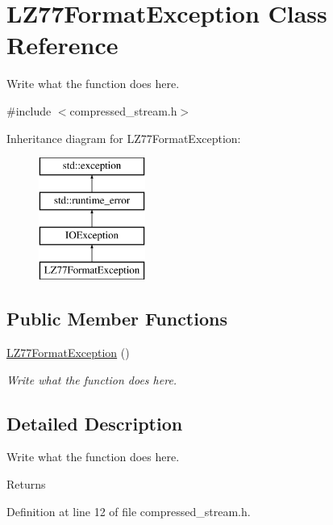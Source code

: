 \hypertarget{classLZ77FormatException}{\section{L\+Z77\+Format\+Exception Class Reference}
\label{classLZ77FormatException}
}


Write what the function does here.  




{\ttfamily \#include $<$compressed\+\_\+stream.\+h$>$}

Inheritance diagram for L\+Z77\+Format\+Exception\+:\begin{figure}[H]
\begin{center}
\leavevmode
\includegraphics[height=4.000000cm]{classLZ77FormatException}
\end{center}
\end{figure}
\subsection*{Public Member Functions}
\begin{DoxyCompactItemize}
\item 
\hyperlink{classLZ77FormatException_ad7d83449811bccd5172e5ba76960d3d3}{L\+Z77\+Format\+Exception} ()
\begin{DoxyCompactList}\small\item\em Write what the function does here. \end{DoxyCompactList}\end{DoxyCompactItemize}


\subsection{Detailed Description}
Write what the function does here. 

\begin{DoxyReturn}{Returns}

\end{DoxyReturn}


Definition at line 12 of file compressed\+\_\+stream.\+h.



